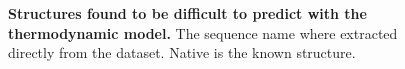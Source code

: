 \begin{figure}[t!]
{
	}
	
	\caption{\textbf{Structures found to be difficult to predict with the thermodynamic model.} The sequence name where extracted directly from the dataset. Native is the known structure.\label{diff_struct}}
\end{figure}

